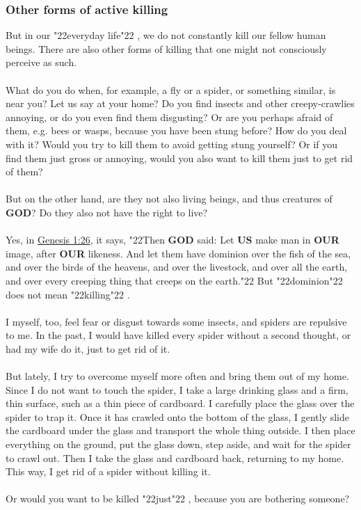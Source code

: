 \documentclass[12pt,a5paper]{article}
\newcommand{\God}[0]{\textbf{GOD}}
\newcommand{\Our}[0]{\textbf{OUR}}
\newcommand{\Us}[0]{\textbf{US}}
\newcommand{\q}[1]{\char"22{#1}\char"22 }
\begin{document}
	\subsubsection{Other forms of active killing}
		But in our \q{everyday life},
		we do not constantly kill our fellow human beings.
		There are also other forms of killing that one might not consciously perceive as such.
		\\
		\\
		What do you do when,
		for example,
		a fly or a spider,
		or something similar,
		is near you?
		Let us say at your home?
		Do you find insects and other creepy-crawlies annoying,
		or do you even find them disgusting?
		Or are you perhaps afraid of them,
		e.g. bees or wasps,
		because you have been stung before?
		How do you deal with it?
		Would you try to kill them to avoid getting stung yourself?
		Or if you find them just gross or annoying,
		would you also want to kill them just to get rid of them?
		\\
		\\
		But on the other hand,
		are they not also living beings,
		and thus creatures of {\God}?
		Do they also not have the right to live?
		\\
		\\
		Yes, in \href{https://www.die-bibel.de/bibeln/online-bibeln/lesen/ESV/GEN.1/Genesis-1}{Genesis 1:26},
		it says, 
		\q{Then {\God} said:
		Let {\Us} make man in {\Our} image,
		after {\Our} likeness.
		And let them have dominion over the fish of the sea,
		and over the birds of the heavens,
		and over the livestock,
		and over all the earth,
		and over every creeping thing that creeps on the earth.}
		But \q{dominion} does not mean \q{killing}.
		\\
		\\
		I myself,
		too,
		feel fear or disgust towards some insects,
		and spiders are repulsive to me.
		In the past,
		I would have killed every spider without a second thought,
		or had my wife do it,
		just to get rid of it.
		\\
		\\
		But lately,
		I try to overcome myself more often and bring them out of my home.
		Since I do not want to touch the spider,
		I take a large drinking glass and a firm,
		thin surface,
		such as a thin piece of cardboard.
		I carefully place the glass over the spider to trap it.
		Once it has crawled onto the bottom of the glass,
		I gently slide the cardboard under the glass and transport the whole thing outside.
		I then place everything on the ground,
		put the glass down,
		step aside,
		and wait for the spider to crawl out.
		Then I take the glass and cardboard back,
		returning to my home.
		This way,
		I get rid of a spider without killing it.
		\\
		\\
		Or would you want to be killed \q{just},
		because you are bothering someone?
\end{document}
